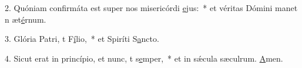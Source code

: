 2. Quóniam confirmáta est super nos misericórdi \uline{e}jus:~* et véritas Dómini manet n æt\uline{é}rnum.\par 
3. Glória Patri, t F\uline{í}lio,~* et Spiríti S\uline{a}ncto.\par 
4. Sicut erat in princípio, et nunc, t s\uline{e}mper,~* et in sǽcula sæculrum. \uline{A}men.\par 
